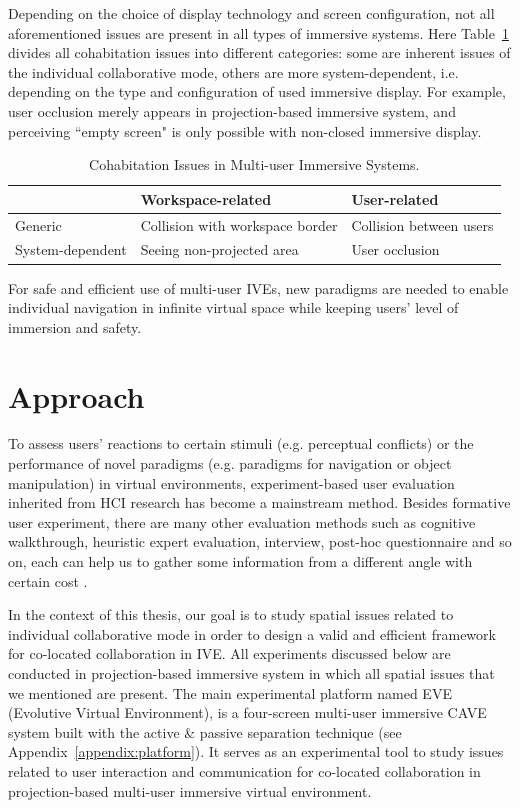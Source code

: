 Depending on the choice of display technology and screen configuration, not all aforementioned issues are present in all types of immersive systems. Here Table~\ref{tab:cohab_issues} divides all cohabitation issues into different categories: some are inherent issues of the individual collaborative mode, others are more system-dependent, i.e. depending on the type and configuration of used immersive display. For example, user occlusion merely appears in projection-based immersive system, and perceiving ``empty screen" is only possible with non-closed immersive display. 

\begin{table}[htb]
\renewcommand{\arraystretch}{1.3}
\caption{Cohabitation Issues in Multi-user Immersive Systems.}
\label{tab:cohab_issues}
\centering
\begin{tabular}{l l l}
  \hline
   & Workspace-related & User-related \\ \hline
  Generic & Collision with workspace border & Collision between users \\
  System-dependent & Seeing non-projected area & User occlusion \\ \hline
\end{tabular}
\end{table}

For safe and efficient use of multi-user IVEs, new paradigms are needed to enable individual navigation in infinite virtual space while keeping users' level of immersion and safety.


\section{Approach}
To assess users' reactions to certain stimuli (e.g. perceptual conflicts) or the performance of novel paradigms (e.g. paradigms for navigation or object manipulation) in virtual environments, experiment-based user evaluation inherited from HCI research has become a mainstream method. Besides formative user experiment, there are many other evaluation methods such as cognitive walkthrough, heuristic expert evaluation, interview, post-hoc questionnaire and so on, each can help us to gather some information from a different angle with certain cost \citep{Bowman2002Survey}.

In the context of this thesis, our goal is to study spatial issues related to individual collaborative mode in order to design a valid and efficient framework for co-located collaboration in IVE. All experiments discussed below are conducted in projection-based immersive system in which all spatial issues that we mentioned are present. The main experimental platform named EVE (Evolutive Virtual Environment), is a four-screen multi-user immersive CAVE system built with the active \& passive separation technique (see Appendix~\ref{appendix:platform}). It serves as an experimental tool to study issues related to user interaction and communication for co-located collaboration in projection-based multi-user immersive virtual environment.

